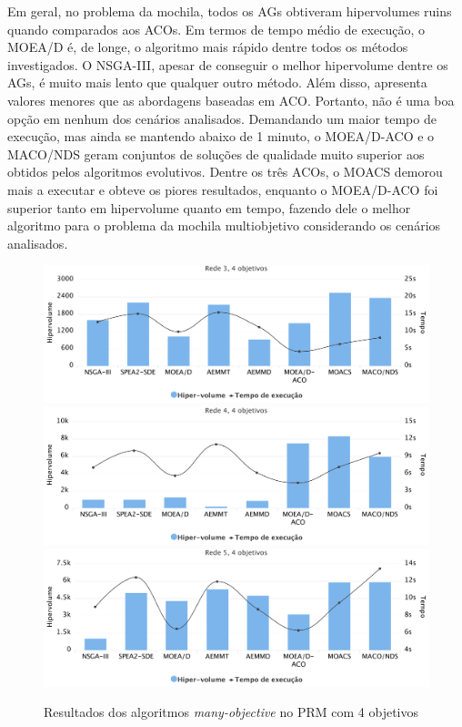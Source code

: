 Em geral, no problema da mochila, todos os AGs obtiveram hipervolumes ruins quando comparados aos ACOs. Em termos de tempo médio de execução, o MOEA/D é, de longe, o algoritmo mais rápido dentre todos os métodos investigados. O NSGA-III, apesar de conseguir o melhor hipervolume dentre os AGs, é muito mais lento que qualquer outro método. Além disso, apresenta valores menores que as abordagens baseadas em ACO. Portanto, não é uma boa opção em nenhum dos cenários analisados. Demandando um maior tempo de execução, mas ainda se mantendo abaixo de 1 minuto, o MOEA/D-ACO e o MACO/NDS geram conjuntos de soluções de qualidade muito superior aos obtidos pelos algoritmos evolutivos. Dentre os três ACOs, o MOACS demorou mais a executar e obteve os piores resultados, enquanto o MOEA/D-ACO foi superior tanto em hipervolume quanto em tempo, fazendo dele o melhor algoritmo para o problema da mochila multiobjetivo considerando os cenários analisados.

\begin{figure}[!htbp]	
	\includegraphics[width=1\textwidth]{cap_experimentos/figs/etapa4/r3o4}
	\includegraphics[width=1\textwidth]{cap_experimentos/figs/etapa4/r4o4}
	\includegraphics[width=1\textwidth]{cap_experimentos/figs/etapa4/r5o4}
	\caption{\label{fig_exp4_mrp_o4}Resultados dos algoritmos \textit{many-objective} no PRM com 4 objetivos}
\end{figure}

